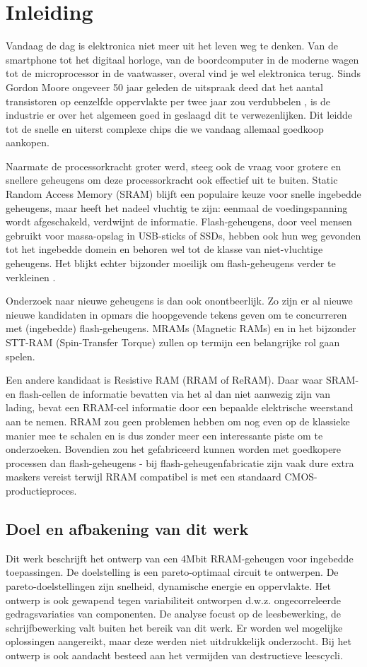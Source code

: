 \chapter{Inleiding}
\label{inleiding}

Vandaag de dag is elektronica niet meer uit het leven weg te denken. Van de smartphone tot het digitaal horloge, van de boordcomputer in de moderne wagen tot de microprocessor in de vaatwasser, overal vind je wel elektronica terug.
Sinds Gordon Moore ongeveer 50 jaar geleden de uitspraak deed dat het aantal transistoren op eenzelfde oppervlakte per twee jaar zou verdubbelen \cite{Moo65}, is de industrie er over het algemeen goed in geslaagd dit te verwezenlijken. Dit leidde tot de snelle en uiterst complexe chips die we vandaag allemaal goedkoop aankopen.

Naarmate de processorkracht groter werd, steeg ook de vraag voor grotere en snellere geheugens om deze processorkracht ook effectief uit te buiten. Static Random Access Memory (SRAM) blijft een populaire keuze voor snelle ingebedde geheugens, maar heeft het nadeel vluchtig te zijn: eenmaal de voedingspanning wordt afgeschakeld, verdwijnt de informatie. Flash-geheugens, door veel mensen gebruikt voor massa-opslag in USB-sticks of SSDs, hebben ook hun weg gevonden tot het ingebedde domein en behoren wel tot de klasse van niet-vluchtige geheugens.
Het blijkt echter bijzonder moeilijk om flash-geheugens verder te verkleinen \cite{Pra10}.

Onderzoek naar nieuwe geheugens is dan ook onontbeerlijk. Zo zijn er al nieuwe nieuwe kandidaten in opmars die hoopgevende tekens geven om te concurreren met (ingebedde) flash-geheugens. MRAMs (Magnetic RAMs) en in het bijzonder STT-RAM (Spin-Transfer Torque) zullen op termijn een belangrijke rol gaan spelen.

Een andere kandidaat is Resistive RAM (RRAM of ReRAM). Daar waar SRAM- en flash-cellen de informatie bevatten via het al dan niet aanwezig zijn van lading, bevat een RRAM-cel informatie door een bepaalde elektrische weerstand aan te nemen. RRAM zou geen problemen hebben om nog even op de klassieke manier mee te schalen en is dus zonder meer een interessante piste om te onderzoeken. Bovendien zou het gefabriceerd kunnen worden met goedkopere processen dan flash-geheugens - bij flash-geheugenfabricatie zijn vaak dure extra maskers vereist terwijl RRAM compatibel is met een standaard CMOS-productieproces.

\section{Doel en afbakening van dit werk}
Dit werk beschrijft het ontwerp van een 4Mbit RRAM-geheugen voor ingebedde toepassingen. De doelstelling is een pareto-optimaal circuit te ontwerpen. De pareto-doelstellingen zijn snelheid, dynamische energie en oppervlakte. Het ontwerp is ook gewapend tegen variabiliteit ontworpen d.w.z. ongecorreleerde gedragsvariaties van componenten. De analyse focust op de leesbewerking, de schrijfbewerking valt buiten het bereik van dit werk. Er worden wel mogelijke oplossingen aangereikt, maar deze werden niet uitdrukkelijk onderzocht. Bij het ontwerp is ook aandacht besteed aan het vermijden van destructieve leescycli.

